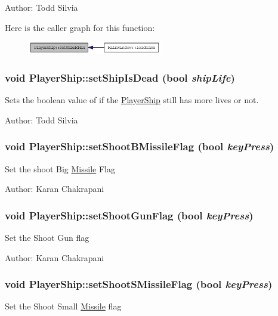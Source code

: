 Author: Todd Silvia 

Here is the caller graph for this function:\nopagebreak
\begin{figure}[H]
\begin{center}
\leavevmode
\includegraphics[width=166pt]{class_player_ship_a26c3da7df2435e3d6b114db177ea1e92_icgraph}
\end{center}
\end{figure}
\hypertarget{class_player_ship_aa5d50b87e6af5b579e851dd216cee0f3}{
\subsubsection[{setShipIsDead}]{\setlength{\rightskip}{0pt plus 5cm}void PlayerShip::setShipIsDead (bool {\em shipLife})}}
\label{class_player_ship_aa5d50b87e6af5b579e851dd216cee0f3}
Sets the boolean value of if the \hyperlink{class_player_ship}{PlayerShip} still has more lives or not.

Author: Todd Silvia \hypertarget{class_player_ship_a9bab47afe26e4a08171c07043670905b}{
\subsubsection[{setShootBMissileFlag}]{\setlength{\rightskip}{0pt plus 5cm}void PlayerShip::setShootBMissileFlag (bool {\em keyPress})}}
\label{class_player_ship_a9bab47afe26e4a08171c07043670905b}
Set the shoot Big \hyperlink{class_missile}{Missile} Flag

Author: Karan Chakrapani \hypertarget{class_player_ship_a01ccc6b6aeb1a8633ebf4caeab995ff6}{
\subsubsection[{setShootGunFlag}]{\setlength{\rightskip}{0pt plus 5cm}void PlayerShip::setShootGunFlag (bool {\em keyPress})}}
\label{class_player_ship_a01ccc6b6aeb1a8633ebf4caeab995ff6}
Set the Shoot Gun flag

Author: Karan Chakrapani \hypertarget{class_player_ship_a445b0862199571801e5b3f62b1439b67}{
\subsubsection[{setShootSMissileFlag}]{\setlength{\rightskip}{0pt plus 5cm}void PlayerShip::setShootSMissileFlag (bool {\em keyPress})}}
\label{class_player_ship_a445b0862199571801e5b3f62b1439b67}
Set the Shoot Small \hyperlink{class_missile}{Missile} flag

